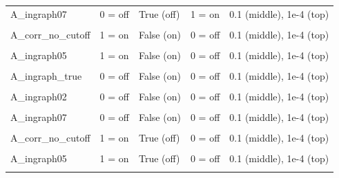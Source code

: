 \documentclass[
]{article}
\begin{document}
\begin{longtable}[t]{>{\raggedright\arraybackslash}p{8em}llll}
A\_ingraph07 & 0 = off & True (off) & 1 = on & 0.1 (middle), 1e-4 (top)\\
\addlinespace
\cellcolor{gray!10}{A\_ingraph\_true} & \cellcolor{gray!10}{1 = on} & \cellcolor{gray!10}{False (on)} & \cellcolor{gray!10}{0 = off} & \cellcolor{gray!10}{0.1 (middle), 1e-4 (top)}\\
A\_corr\_no\_cutoff & 1 = on & False (on) & 0 = off & 0.1 (middle), 1e-4 (top)\\
\cellcolor{gray!10}{A\_ingraph02} & \cellcolor{gray!10}{1 = on} & \cellcolor{gray!10}{False (on)} & \cellcolor{gray!10}{0 = off} & \cellcolor{gray!10}{0.1 (middle), 1e-4 (top)}\\
A\_ingraph05 & 1 = on & False (on) & 0 = off & 0.1 (middle), 1e-4 (top)\\
\cellcolor{gray!10}{A\_ingraph07} & \cellcolor{gray!10}{1 = on} & \cellcolor{gray!10}{False (on)} & \cellcolor{gray!10}{0 = off} & \cellcolor{gray!10}{0.1 (middle), 1e-4 (top)}\\
\addlinespace
A\_ingraph\_true & 0 = off & False (on) & 0 = off & 0.1 (middle), 1e-4 (top)\\
\cellcolor{gray!10}{A\_corr\_no\_cutoff} & \cellcolor{gray!10}{0 = off} & \cellcolor{gray!10}{False (on)} & \cellcolor{gray!10}{0 = off} & \cellcolor{gray!10}{0.1 (middle), 1e-4 (top)}\\
A\_ingraph02 & 0 = off & False (on) & 0 = off & 0.1 (middle), 1e-4 (top)\\
\cellcolor{gray!10}{A\_ingraph05} & \cellcolor{gray!10}{0 = off} & \cellcolor{gray!10}{False (on)} & \cellcolor{gray!10}{0 = off} & \cellcolor{gray!10}{0.1 (middle), 1e-4 (top)}\\
A\_ingraph07 & 0 = off & False (on) & 0 = off & 0.1 (middle), 1e-4 (top)\\
\addlinespace
\cellcolor{gray!10}{A\_ingraph\_true} & \cellcolor{gray!10}{1 = on} & \cellcolor{gray!10}{True (off)} & \cellcolor{gray!10}{0 = off} & \cellcolor{gray!10}{0.1 (middle), 1e-4 (top)}\\
A\_corr\_no\_cutoff & 1 = on & True (off) & 0 = off & 0.1 (middle), 1e-4 (top)\\
\cellcolor{gray!10}{A\_ingraph02} & \cellcolor{gray!10}{1 = on} & \cellcolor{gray!10}{True (off)} & \cellcolor{gray!10}{0 = off} & \cellcolor{gray!10}{0.1 (middle), 1e-4 (top)}\\
A\_ingraph05 & 1 = on & True (off) & 0 = off & 0.1 (middle), 1e-4 (top)\\
\cellcolor{gray!10}{A\_ingraph07} & \cellcolor{gray!10}{1 = on} & \cellcolor{gray!10}{True (off)} & \cellcolor{gray!10}{0 = off} & \cellcolor{gray!10}{0.1 (middle), 1e-4 (top)}\\

\end{longtable}
\end{document}
